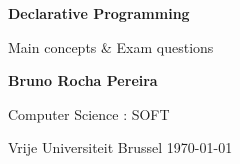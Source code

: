 \begin{titlepage}
    \begin{center}
        \vspace*{1cm}
        
        \Huge
        \textbf{Declarative Programming}
        
        \vspace{0.5cm}
        \LARGE
        Main concepts \& Exam questions %
        
        \vspace{1.5cm}
        
        \textbf{Bruno Rocha Pereira}
   		  \vspace{1.5cm}
        
       
        \vfill
        
        Computer Science : SOFT
        
        \vspace{0.8cm}
          \Large
        Vrije Universiteit Brussel
       \today
        
    \end{center}
\end{titlepage}